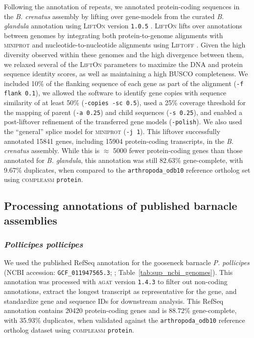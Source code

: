 Following the annotation of repeats, we annotated protein-coding sequences in the
\textit{B. crenatus} assembly by lifting over gene-models from the curated \textit{B.
glandula} annotation using \textsc{LiftOn} version \texttt{1.0.5}
\citep{chao_lifton_2024}.
\textsc{LiftOn} lifts over annotations between genomes by integrating both
protein-to-genome alignments with \textsc{miniprot} \citep{li_miniprot_2023} and
nucleotide-to-nucleotide alignments using \textsc{Liftoff} \citep{shumate_liftoff_2021}.
Given the high diversity observed within these genomes and the high divergence
between them, we relaxed several of the \textsc{LiftOn} parameters to maximize the
DNA and protein sequence identity scores, as well as maintaining a high \textsc{BUSCO}
completeness.
We included 10\% of the flanking sequence of each gene as part of the alignment
(\texttt{-f flank 0.1}), we allowed the software to identify gene copies with sequence
similarity of at least 50\% (\texttt{-copies -sc 0.5}), used a 25\% coverage
threshold for the mapping of parent (\texttt{-a 0.25}) and child sequences
(\texttt{-s 0.25}), and enabled a post-liftover refinement of the transferred
gene models (\texttt{-polish}).
We also used the ``general'' splice model for \textsc{miniprot} (\texttt{-j 1}).
This liftover successfully annotated \num{15841} genes, including \num{15904} protein-coding
transcripts, in the \textit{B. crenatus} assembly.
While this is $\approx$ \num{5000} fewer protein-coding genes than those annotated for
\textit{B. glandula}, this annotation was still 82.63\% gene-complete, with 9.67\%
duplicates, when compared to the \texttt{arthropoda\_odb10} reference ortholog set
using \textsc{compleasm} \texttt{protein}.

\subsection*{Processing annotations of published barnacle assemblies}\label{sec:sup_methods_barnacle_rna}

\subsubsection*{\textit{Pollicipes pollicipes}}

We used the published RefSeq annotation for the gooseneck barnacle \textit{P.
pollicipes} (NCBI accession: \texttt{GCF\_011947565.3};
\cite{bernot_chromosome-level_2022}; Table~\ref{tab:sup_ncbi_genomes}).
This annotation was processed with \textsc{agat} version \texttt{1.4.3}
\citep{dainat_another_2022} to filter out non-coding annotations, extract the longest 
transcript as representative for the gene, and standardize gene and sequence IDs for
downstream analysis.
This RefSeq annotation contains \num{20420} protein-coding genes and is 88.72\%
gene-complete, with 35.93\% duplicates, when validated against the
\texttt{arthropoda\_odb10} reference ortholog dataset using \textsc{compleasm}
\texttt{protein}.

